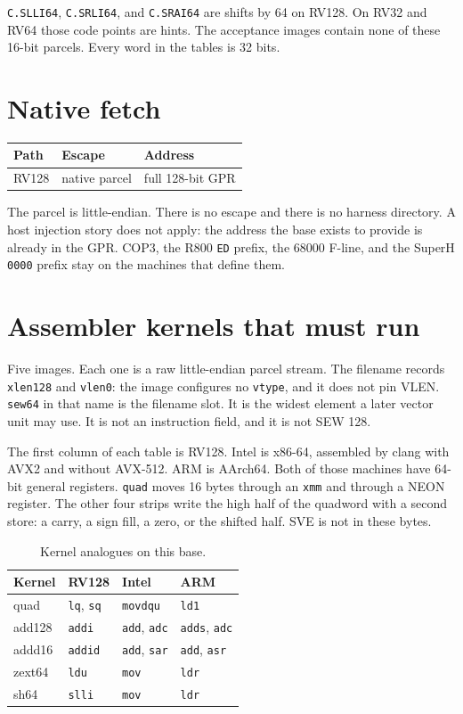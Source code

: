 \texttt{C.SLLI64}, \texttt{C.SRLI64}, and \texttt{C.SRAI64} are shifts by 64 on RV128. On RV32 and RV64 those code points are hints. The acceptance images contain none of these 16-bit parcels. Every word in the tables is 32 bits.

\section{Native fetch}

\begin{center}
\begin{tabular}{@{}lll@{}}
\toprule
Path & Escape & Address \\
\midrule
RV128 & native parcel & full 128-bit GPR \\
\bottomrule
\end{tabular}
\end{center}

The parcel is little-endian. There is no escape and there is no harness directory. A host injection story does not apply: the address the base exists to provide is already in the GPR. COP3, the R800 \texttt{ED} prefix, the 68000 F-line, and the SuperH \texttt{0000} prefix stay on the machines that define them.

\section{Assembler kernels that must run}

Five images. Each one is a raw little-endian parcel stream. The filename records \texttt{xlen128} and \texttt{vlen0}: the image configures no \texttt{vtype}, and it does not pin VLEN. \texttt{sew64} in that name is the filename slot. It is the widest element a later vector unit may use. It is not an instruction field, and it is not SEW 128.

The first column of each table is RV128. Intel is x86-64, assembled by clang with AVX2 and without AVX-512. ARM is AArch64. Both of those machines have 64-bit general registers. \texttt{quad} moves 16 bytes through an \texttt{xmm} and through a NEON register. The other four strips write the high half of the quadword with a second store: a carry, a sign fill, a zero, or the shifted half. SVE is not in these bytes.

\begin{table}[htbp]
\centering
\caption{Kernel analogues on this base.}
\small
\begin{tabular}{@{}llll@{}}
\toprule
Kernel & RV128 & Intel & ARM \\
\midrule
quad & \texttt{lq}, \texttt{sq} & \texttt{movdqu} & \texttt{ld1} \\
add128 & \texttt{addi} & \texttt{add}, \texttt{adc} & \texttt{adds}, \texttt{adc} \\
addd16 & \texttt{addid} & \texttt{add}, \texttt{sar} & \texttt{add}, \texttt{asr} \\
zext64 & \texttt{ldu} & \texttt{mov} & \texttt{ldr} \\
sh64 & \texttt{slli} & \texttt{mov} & \texttt{ldr} \\
\bottomrule
\end{tabular}
\end{table}


